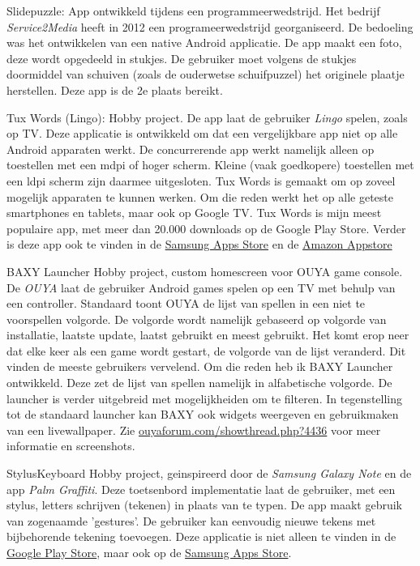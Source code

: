 \documentclass[10pt,a4paper]{article}
\begin{document}
\inlineheadsection
{Slidepuzzle:}
{App ontwikkeld tijdens een programmeerwedstrijd. Het bedrijf \emph{Service2Media} heeft in 2012 een programeerwedstrijd georganiseerd. De bedoeling was het ontwikkelen van een native Android applicatie. De app maakt een foto, deze wordt opgedeeld in stukjes. De gebruiker moet volgens de stukjes doormiddel van schuiven (zoals de ouderwetse schuifpuzzel) het originele plaatje herstellen. Deze app is de 2e plaats bereikt.}

\inlineheadsection
{Tux Words (Lingo):}
{Hobby project. De app laat de gebruiker \emph{Lingo} spelen, zoals op TV. Deze applicatie is ontwikkeld om dat een vergelijkbare app niet op alle Android apparaten werkt. De concurrerende app werkt namelijk alleen op toestellen met een mdpi of hoger scherm. Kleine (vaak goedkopere) toestellen met een ldpi scherm zijn daarmee uitgesloten. Tux Words is gemaakt om op zoveel mogelijk apparaten te kunnen werken. Om die reden werkt het op alle geteste smartphones en tablets, maar ook op Google TV. Tux Words is mijn meest populaire app, met meer dan 20.000 downloads op de Google Play Store. Verder is deze app ook te vinden in de \href{http://apps.samsung.com/venus/topApps/topAppsDetail.as?productId=000000498917}{Samsung Apps Store} en de \href{http://www.amazon.com/FrankkieNL-Tux-Words-Lingo/dp/B0096M4AYU/}{Amazon Appstore}}

\inlineheadsection
{BAXY Launcher}
{Hobby project, custom homescreen voor OUYA game console. De \emph{OUYA} laat de gebruiker Android games spelen op een TV met behulp van een controller. Standaard toont OUYA de lijst van spellen in een niet te voorspellen volgorde. De volgorde wordt namelijk gebaseerd op volgorde van installatie, laatste update, laatst gebruikt en meest gebruikt. Het komt erop neer dat elke keer als een game wordt gestart, de volgorde van de lijst veranderd. Dit vinden de meeste gebruikers vervelend. Om die reden heb ik BAXY Launcher ontwikkeld. Deze zet de lijst van spellen namelijk in alfabetische volgorde. De launcher is verder uitgebreid met mogelijkheiden om te filteren. In tegenstelling tot de standaard launcher kan BAXY ook widgets weergeven en gebruikmaken van een livewallpaper. Zie \href{http://ouyaforum.com/showthread.php?4436-BAXY-Custom-Launcher}{ouyaforum.com/showthread.php?4436} voor meer informatie en screenshots.}

\inlineheadsection
{StylusKeyboard}
{Hobby project, geinspireerd door de \emph{Samsung Galaxy Note} en de app \emph{Palm Graffiti}. Deze toetsenbord implementatie laat de gebruiker, met een stylus, letters schrijven (tekenen) in plaats van te typen. De app maakt gebruik van zogenaamde 'gestures'. De gebruiker kan eenvoudig nieuwe tekens met bijbehorende tekening toevoegen. Deze applicatie is niet alleen te vinden in de \href{https://play.google.com/store/apps/details?id=nl.frankkie.styluskeyboard}{Google Play Store}, maar ook op de \href{http://apps.samsung.com/venus/topApps/topAppsDetail.as?productId=000000499470}{Samsung Apps Store}.}
\end{document}
